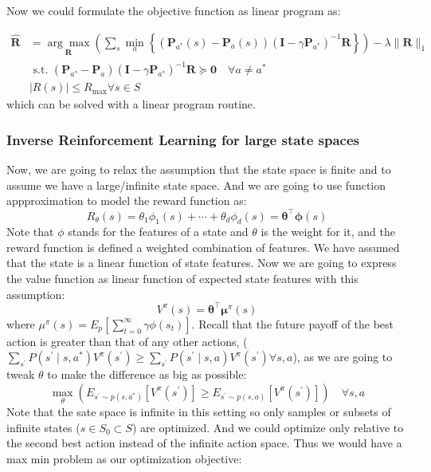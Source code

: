 \documentclass[11pt]{article}
\begin{document}
Now we could formulate the objective function as linear program as:

$$
\begin{aligned}
\hat{\mathbf{R}}&=\underset{\mathbf{R}}{\arg \max }\left(\sum_{s} \min _{a}\left\{\left(\mathbf{P}_{a^{*}}(s)-\mathbf{P}_{a}(s)\right)\left(\mathbf{I}-\gamma \mathbf{P}_{a^{*}}\right)^{-1} \mathbf{R}\right\}\right)-\lambda\|\mathbf{R}\|_{1} \\
&\text { s.t. } \left(\mathbf{P}_{a^{*}}-\mathbf{P}_{a}\right)\left(\mathbf{I}-\gamma \mathbf{P}_{a^{*}}\right)^{-1} \mathbf{R} \succeq \mathbf{0} \quad \forall a \neq a^{*} \\
&|R(s)| \leq R_{\max } \forall s \in S
\end{aligned}
$$
which can be solved with a linear program routine.


\subsubsection{Inverse Reinforcement Learning for large state spaces}
Now, we are going to relax the assumption that the state space is finite and to assume we have a large/infinite state space. And we are going to use function appproximation to model the reward function as: 
$$
R_{\theta}(s)=\theta_{1} \phi_{1}(s)+\cdots+\theta_{d} \phi_{d}(s)=\boldsymbol{\theta}^{\top} \boldsymbol{\phi}(s)
$$
Note that $\phi$ stands for the features of a state and $\theta$ is the weight for it, and the reward function is defined a weighted combination of features. We have assumed that the state is a linear function of state features. Now we are going to express the value function as linear function of expected state features with this assumption:
$$
V^{\pi}(s)=\boldsymbol{\theta}^{\top} \boldsymbol{\mu}^{\pi}(s)
$$
where $
\mu^{\pi}(s)=E_{p}\left[\sum_{t=0}^{\infty} \gamma \phi\left(s_{t}\right)\right]
$. Recall that the future payoff of the best action is greater than that of any other actions, ($\sum_{s^{\prime}} P\left(s^{\prime} \mid s, a^{*}\right) V^{\pi}\left(s^{\prime}\right) \geq \sum_{s^{\prime}} P\left(s^{\prime} \mid s, a\right) V^{\pi}\left(s^{\prime}\right) \forall s, a$), as we are going to tweak $\theta$ to make the difference as big as possible:
$$
\max _{\theta}\left(E_{s^{\prime} \sim p\left(s, a^{*}\right)}\left[V^{\pi}\left(s^{\prime}\right)\right] \geq E_{s^{\prime} \sim p(s, a)}\left[V^{\pi}\left(s^{\prime}\right)\right]\right) \quad \forall s, a
$$
Note that the sate space is infinite in this setting so only samples or subsets of infinite states ($s \in S_{0} \subset S$) are optimized. And we could  optimize only relative to the second best action instead of the infinite action space. Thus we would have a max min problem as our optimization objective:
\end{document}
